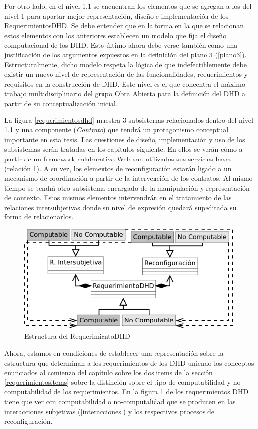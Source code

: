 \begin{descrition}
\begin{definition}
Por otro lado, en el nivel 1.1 se encuentran los elementos que se agregan a los
del nivel 1 para aportar mejor representación, diseño e implementación de
los RequerimientosDHD. Se debe entender que en la forma en la que se relacionan
estos elementos con los anteriores establecen un modelo que fija el diseño
computacional de los DHD. Esto último ahora debe verse también como una
justificación de los argumentos expuestos en la definición del plano 3
(\ref{plano3}). Estructuralmente, dicho modelo respeta la lógica de que
indefectiblemente debe existir un nuevo nivel de representación de las
funcionalidades, requerimientos y requisitos en la construcción de DHD. Este
nivel es el que concentra el máximo trabajo multidisciplinario del grupo Obra
Abierta para la definición del DHD a partir de su conceptualización inicial.  

La figura \ref{requerimientosdhd} muestra 3 subsistemas relacionados dentro del
nivel 1.1 y una componente (\textit{Contrato}) que tendrá un protagonismo
conceptual importante en esta tesis. Las cuestiones de diseño, implementación
y uso de los subsistemas serán tratadas en los capítulos siguiente. En ellos
se verán cómo a partir de un framework colaborativo Web son utilizados sus
servicios bases (relación 1). A su vez, los elementos de reconfiguración
estarán ligado a un mecanismo de coordinación a partir de la intervención de
los contratos. Al mismo tiempo se tendrá otro subsistema encargado de la
manipulación y representación de contexto. Estos mismos elementos
intervendrán en el tratamiento de las relaciones intersubjetivas donde su
nivel de expresión quedará supeditada su forma de relacionarlos.

\begin{figure}[h]
\begin{center}
 \includegraphics[width=3 in,totalheight=3 in] {DHD/RequerimientosDHD2}
\caption{Estructura del RequerimientoDHD} \label{RequerimientosDHD2}
\end{center}
 \end{figure}

Ahora, estamos en condiciones de establecer una representación sobre la
estructura que determinan a los requerimientos de los DHD uniendo los conceptos
enunciados al comienzo del capítulo sobre los dos items de la sección
\ref{requerimientositems} sobre la distinción sobre el tipo de computabilidad
y no-computabilidad de los requerimientos. En la figura \ref{RequerimientosDHD2}
de los requerimientos DHD tiene que ver con computabilidad o no-computalidad que
se producen en las interacciones subjetivas (\ref{interacciones}) y
los respectivos procesos de reconfiguración. 



\end{definition}
\end{descrition}
